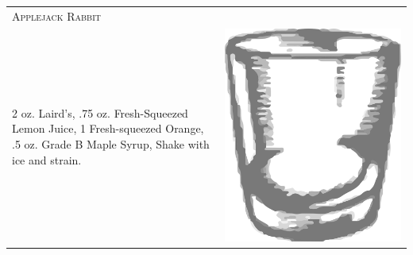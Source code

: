 \documentclass{article}
\begin{document}
\begin{tabular}{p{2in} p{0.5in}}
	\multicolumn{2}{p{3in}}{\centering\Huge\textsc{Applejack Rabbit}} \\
	  \vspace{-0.1in}2 oz. Laird's, .75 oz. Fresh-Squeezed Lemon Juice, 1 Fresh-squeezed Orange, .5 oz. Grade B Maple Syrup, Shake with ice and strain.&
	  \vspace{-0.1in} \includegraphics{rocks_glass.png}
\end{tabular}
\end{document}
